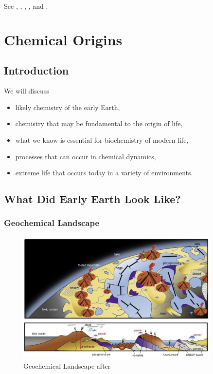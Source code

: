 \documentclass[]{article}
\begin{document}
See \cite{eigen1978hypercycle}, \cite{eigen1988molecular}, \cite{eigen2002error}, \cite{crotty2001rna}, and \cite{stadtler2002fitness_landscapes}.


\section{Chemical Origins}
\subsection{Introduction}

We will discuss 
\begin{itemize}
	\item likely chemistry of the early Earth,
	\item chemistry that may be  fundamental to the origin of life,
	\item what we know is essential for biochemistry of modern life,
	\item processes that can occur in chemical dynamics, 
	\item extreme life that occurs today in a variety of environments.
\end{itemize}


\subsection{What Did Early Earth Look Like?}

\subsubsection{Geochemical Landscape}
\begin{figure}[h!]
	\caption{Geochemical Landscape after \cite{kitadai2018origins}}
	\includegraphics[width=0.9\textwidth]{GeochemicalLandscape}
\end{figure}
\end{document}
